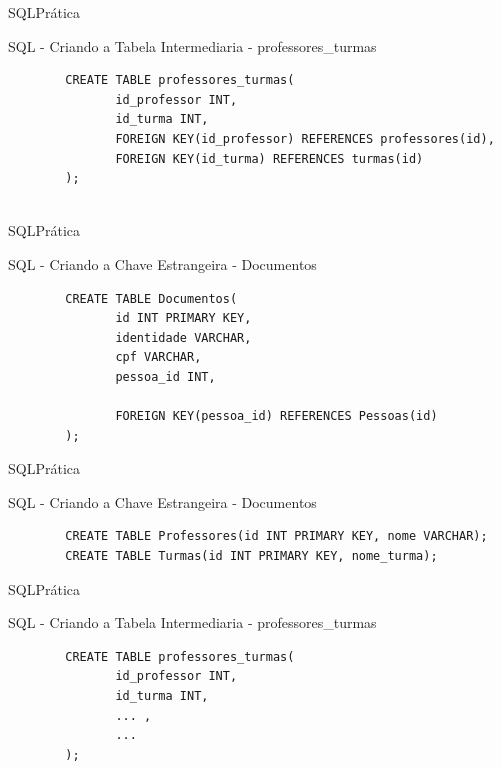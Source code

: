 \documentclass{beamer}
\begin{document}
\begin{frame}[fragile]{SQL}{Prática}
	\begin{block} {SQL - Criando a Tabela Intermediaria - professores\_turmas}
		\begin{verbatim}
		CREATE TABLE professores_turmas(
		       id_professor INT, 
		       id_turma INT, 
		       FOREIGN KEY(id_professor) REFERENCES professores(id), 
		       FOREIGN KEY(id_turma) REFERENCES turmas(id)
		);
		
		\end{verbatim}
	\end{block}
\end{frame}

\begin{frame}[fragile]{SQL}{Prática}
	\begin{block} {SQL - Criando a Chave Estrangeira - Documentos}
		\begin{verbatim}
		CREATE TABLE Documentos(
		       id INT PRIMARY KEY, 
		       identidade VARCHAR, 
		       cpf VARCHAR,  
		       pessoa_id INT,
		
		       FOREIGN KEY(pessoa_id) REFERENCES Pessoas(id)
		);
		\end{verbatim}
	\end{block}
\end{frame}



\begin{frame}[fragile]{SQL}{Prática}
	\begin{block} {SQL - Criando a Chave Estrangeira - Documentos}
		\begin{verbatim}
		CREATE TABLE Professores(id INT PRIMARY KEY, nome VARCHAR);
		CREATE TABLE Turmas(id INT PRIMARY KEY, nome_turma);
		\end{verbatim}
	\end{block}
\end{frame}

\begin{frame}[fragile]{SQL}{Prática}
	\begin{block} {SQL - Criando a Tabela Intermediaria - professores\_turmas}
		\begin{verbatim}
		CREATE TABLE professores_turmas(
		       id_professor INT, 
		       id_turma INT, 
		       ... ,
		       ...
		);
		
		\end{verbatim}
	\end{block}
\end{frame}
\end{document}
